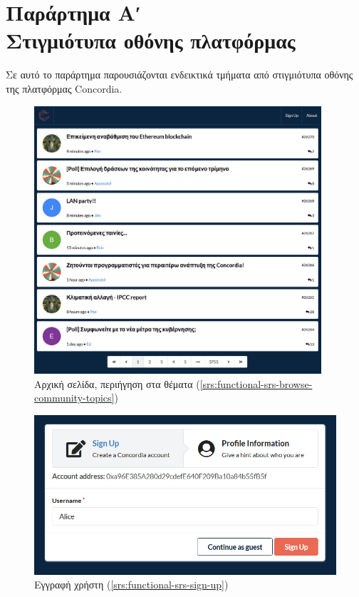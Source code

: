 \chapter*{Παράρτημα Αʹ\\[20pt]Στιγμιότυπα οθόνης πλατφόρμας}\label{appendix-a}


\captionsetup{labelformat=AppendixAFigures}
\setcounter{figure}{0}

Σε αυτό το παράρτημα παρουσιάζονται ενδεικτικά τμήματα από στιγμιότυπα οθόνης της πλατφόρμας Concordia.

\begin{figure}[H]
	\centering
	\includegraphics[width=0.95\textwidth]{assets/figures/appendix-a/screenshot-1-topics-screen}
	\caption{Αρχική σελίδα, περιήγηση στα θέματα (\ref{srs:functional-srs-browse-community-topics})}
\end{figure}

\begin{figure}[H]
	\centering
	\includegraphics[width=\textwidth]{assets/figures/appendix-a/screenshot-2-signup}
	\caption{Εγγραφή χρήστη (\ref{srs:functional-srs-sign-up})}
\end{figure}

